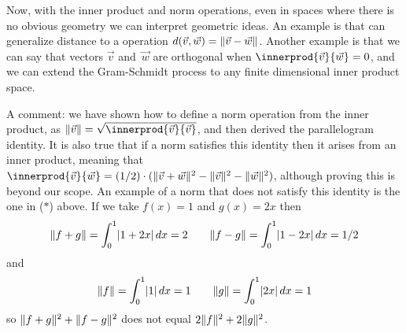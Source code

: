 Now, with the inner product and norm operations, 
even in spaces where there is no obvious geometry
we can interpret geometric ideas. 
An example is that can generalize distance to a
operation
$d(\vec{v},\vec{w})=\lVert\vec{v}-\vec{w}\rVert$.
Another example is that we can say that
vectors $\vec{v}$ and~$\vec{w}$ are orthogonal when 
$\innerprod{\vec{v}}{\vec{w}}=0$,
and we can extend the Gram-Schmidt process
to any finite dimensional inner product space.

A comment: we have shown how to define a norm operation from the inner product, 
as $\norm{\vec{v}}=\sqrt{\smashdp{\innerprod{\vec{v}}{\vec{v}}}}$,
and then derived the
parallelogram identity.
It is also true that if a norm satisfies this identity then it
arises from an inner product, 
meaning that 
$\innerprod{\vec{v}}{\vec{w}}
  =(1/2)\cdot(\norm{\vec{v}+\vec{w}}^2-\norm{\vec{v}}^2-\norm{\vec{w}}^2)$,
although proving this is beyond our scope.
An example of a norm that does not satisfy this identity is the one
in ($*$) above.
If we take $f(x)=1$ and $g(x)=2x$ then
\begin{equation*}
  \lVert f+g\rVert=\int_0^1\lvert1+2x\rvert\,dx=2
  \qquad
  \lVert f-g\rVert=\int_0^1\lvert1-2x\rvert\,dx=1/2
\end{equation*}
and
\begin{equation*}
  \lVert f\rVert=\int_0^1\lvert1\rvert\,dx=1
  \qquad
  \lVert g\rVert=\int_0^1\lvert2x\rvert\,dx=1
\end{equation*}
so 
$\lVert f+g\rVert^2+\lVert f-g\rVert^2$ does not equal $2\lVert f\rVert^2+2\lVert g\rVert^2$.





